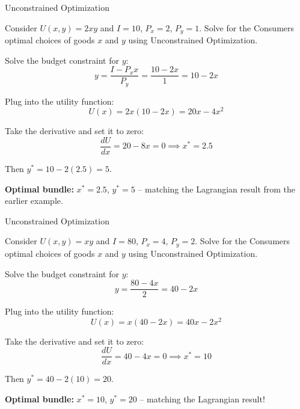 \documentclass{beamer}
\begin{document}
\begin{frame}{Unconstrained Optimization}
  
  \bigskip
  Consider $U(x,y) = 2xy$ and $I=10$, $P_{x} = 2$, $P_{y} = 1$. Solve for the Consumers optimal choices of goods $x$ and $y$ using Unconstrained Optimization.
\end{frame}
\begin{frame}
 
  \bigskip
  Solve the budget constraint for $y$:
  $$
    y = \frac{I - P_x x}{P_y} = \frac{10 - 2x}{1} = 10 - 2x
  $$
 
  \bigskip
  Plug into the utility function:
  $$
    U(x) = 2x(10 - 2x) = 20x - 4x^2
  $$
 
  \bigskip
  Take the derivative and set it to zero:
  $$
    \frac{dU}{dx} = 20 - 8x = 0 \implies x^* = 2.5
  $$
 
  \bigskip
  Then $y^* = 10 - 2(2.5) = 5$.
 
  \bigskip
  \textbf{Optimal bundle:} $x^* = 2.5$, $y^* = 5$ -- matching the Lagrangian result from the earlier example.
\end{frame}
 
\begin{frame}{Unconstrained Optimization}
  
  \bigskip
  Consider $U(x,y) = xy$ and $I=80$, $P_{x} = 4$, $P_{y} = 2$. Solve for the Consumers optimal choices of goods $x$ and $y$ using Unconstrained Optimization.
\end{frame}

\begin{frame}

  \bigskip
  Solve the budget constraint for $y$:
  $$
    y = \frac{80 - 4x}{2} = 40 - 2x
  $$

  \bigskip
  Plug into the utility function:
  $$
    U(x) = x(40 - 2x) = 40x - 2x^2
  $$

  \bigskip
  Take the derivative and set it to zero:
  $$
    \frac{dU}{dx} = 40 - 4x = 0 \implies x^* = 10
  $$

  \bigskip
  Then $y^* = 40 - 2(10) = 20$.

  \bigskip
  \textbf{Optimal bundle:} $x^* = 10$, $y^* = 20$ -- matching the Lagrangian result!
\end{frame}
\end{document}
